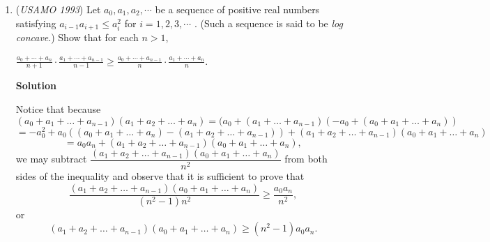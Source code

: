 \begin{enumerate}
 $f_{n+1}=\frac{f_n+f_{n-1}}{2^n}$ for some $n\in \mathbb{Z}^+$ such that $f_{n+1}$ is odd.

 $(2^n)f_{n+1}-f_n=f_{n-1}$
$d(p+q)=f_{n-1}$, where $p$ and $q$ is another integer.

 Thus, $f_{n-1}$ is divisible by $d$ which contradicts with the assumption that $\gcd(f_n,f_{n-1})=1$.

 \textbf{Lemma proven}

 
 By induction, $\gcd(f_n,f_{n-1})=1$ since $\gcd(a,b)=\gcd(f_1,f_2)=1$.

 Since there must exist some $n$ where $f_n=f_{n+1}$ (part 1), $\gcd(f_n,f_{n+1})=f_n=1$.

 $\mathbb{Q.E.D}$



	\item (\textit{USAMO 1993}) Let $a_0, a_1, a_2,\cdots$ be a sequence of positive real numbers satisfying $a_{i-1}a_{i+1}\le a^2_i$
for $i = 1, 2, 3,\cdots$ . (Such a sequence is said to be \textit{log concave}.) Show that for
each $n > 1$,


 $\frac{a_0+\cdots+a_n}{n+1}\cdot\frac{a_1+\cdots+a_{n-1}}{n-1}\ge\frac{a_0+\cdots+a_{n-1}}{n}\cdot\frac{a_1+\cdots+a_{n}}{n}$.

 



\textbf{Solution}

Notice that because
 \[(a_0 + a_1 + \dots + a_{n-1})(a_1 + a_2 + \dots + a_n) = (a_0 + (a_1 + \dots + a_{n-1})(-a_0 + (a_0 + a_1 + \dots + a_n))\]
 \[= -a_0^2 + a_0 ((a_0 + a_1 + \dots + a_n) - (a_1 + a_2 + \dots + a_{n-1})) + (a_1 + a_2 + \dots + a_{n-1})(a_0 + a_1 + \dots + a_n)\]
 \[= a_0 a_n + (a_1 + a_2 + \dots + a_{n-1})(a_0 + a_1 + \dots + a_n),\]we may subtract $\dfrac{(a_1 + a_2 + \dots + a_{n-1})(a_0 + a_1 + \dots + a_n)}{n^2}$ from both sides of the inequality and observe that it is sufficient to prove that
 \[\frac{(a_1 + a_2 + \dots + a_{n-1})(a_0 + a_1 + \dots + a_n)}{(n^2 - 1)n^2} \ge \frac{a_0 a_n}{n^2},\]or
 \[(a_1 + a_2 + \dots + a_{n-1})(a_0 + a_1 + \dots + a_n) \ge (n^2 - 1) a_0 a_n.\]


\end{enumerate}

